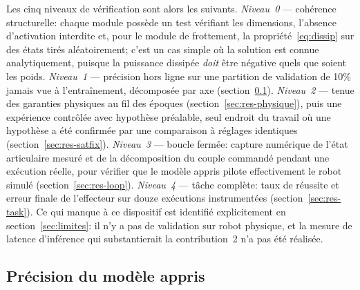 \documentclass[a4paper, oneside]{article}
\begin{document}
Les cinq niveaux de vérification sont alors les suivants. \emph{Niveau~0} —
cohérence structurelle: chaque module possède un test vérifiant les dimensions,
l'absence d'activation interdite et, pour le module de frottement, la
propriété~\eqref{eq:dissip} sur des états tirés aléatoirement; c'est un cas
simple où la solution est connue analytiquement, puisque la puissance dissipée
\emph{doit} être négative quels que soient les poids. \emph{Niveau~1} —
précision hors ligne sur une partition de validation de 10\% jamais vue à
l'entraînement, décomposée par axe (section~\ref{sec:res-stage1}).
\emph{Niveau~2} — tenue des garanties physiques au fil des époques
(section~\ref{sec:res-physique}), puis une expérience contrôlée avec hypothèse
préalable, seul endroit du travail où une hypothèse a été confirmée par une
comparaison à réglages identiques (section~\ref{sec:res-satfix}).
\emph{Niveau~3} — boucle fermée: capture numérique de l'état articulaire mesuré
et de la décomposition du couple commandé pendant une exécution réelle, pour
vérifier que le modèle appris pilote effectivement le robot simulé
(section~\ref{sec:res-loop}). \emph{Niveau~4} — tâche complète: taux de
réussite et erreur finale de l'effecteur sur douze exécutions instrumentées
(section~\ref{sec:res-task}). Ce qui manque à ce dispositif est identifié
explicitement en section~\ref{sec:limites}: il n'y a pas de validation sur
robot physique, et la mesure de latence d'inférence qui substantierait la
contribution~2 n'a pas été réalisée.

\subsection{Précision du modèle appris}
\label{sec:res-stage1}
\end{document}
